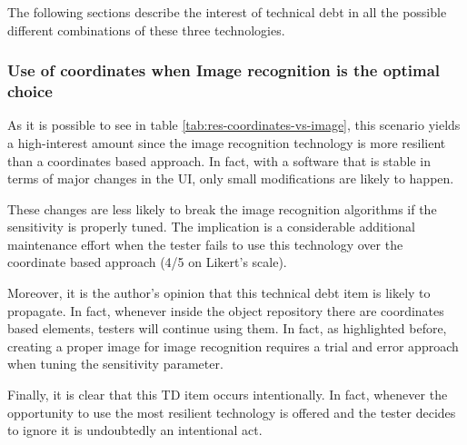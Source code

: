 The following sections describe the interest of technical debt in all the possible different combinations of these three technologies.

\subsubsection{Use of coordinates when Image recognition is the optimal choice} \label{sec:dis-coordinates-vs-image}

As it is possible to see in table  \ref{tab:res-coordinates-vs-image}, this scenario yields a high-interest amount since the image recognition technology is more resilient than a coordinates based approach. In fact, with a software that is stable in terms of major changes in the UI, only small modifications are likely to happen.

 \label{sec:disc-rq3-wrong-technique-1}
These changes are less likely to break the image recognition algorithms if the sensitivity is properly tuned. The implication is a considerable additional maintenance effort when the tester fails to use this technology over the coordinate based approach (4/5 on Likert's scale).

Moreover, it is the author's opinion that this technical debt item is likely to propagate. In fact, whenever inside the object repository there are coordinates based elements, testers will continue using them. In fact, as highlighted before, creating a proper image for image recognition requires a trial and error approach when tuning the sensitivity parameter.

Finally, it is clear that this TD item occurs intentionally. In fact, whenever the opportunity to use the most resilient technology is offered and the tester decides to ignore it is undoubtedly an intentional act.


